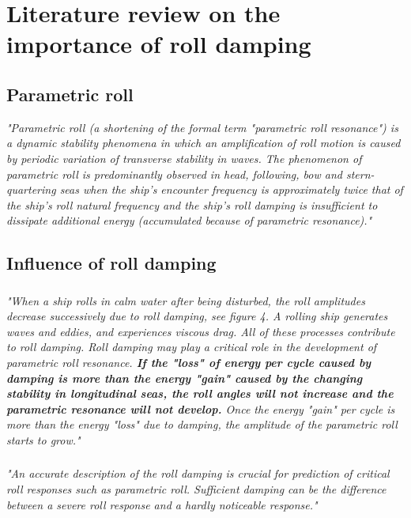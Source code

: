 \section{Literature review on the importance of roll damping}

\subsection{Parametric roll}

\emph{"Parametric roll (a shortening of the formal term "parametric roll resonance") is a dynamic stability phenomena in which an amplification of roll motion is caused by periodic variation of transverse stability in waves. The phenomenon of parametric roll is predominantly observed in head, following, bow and stern-quartering seas when the ship's encounter frequency is approximately twice that of the ship's roll natural frequency and the ship's roll damping is insufficient to dissipate additional energy (accumulated because of parametric resonance)."} \cite{imo_second_nodate}

\subsection{Influence of roll damping}
\subsubsection{}
\emph{"When a ship rolls in calm water after being disturbed, the roll amplitudes decrease successively due to roll damping, see figure 4. A rolling ship generates waves and eddies, and experiences viscous drag. All of these processes contribute to roll damping. Roll damping may play a critical role in the development of parametric roll resonance. \textbf{If the "loss" of energy per cycle caused by damping is more than the energy "gain" caused by the changing stability in longitudinal seas, the roll angles will not increase and the parametric resonance will not develop.} Once the energy "gain" per cycle is more than the energy "loss" due to damping, the amplitude of the parametric roll starts to grow."} \cite{imo_second_nodate}

\subsubsection{}
\emph{"An accurate description of the roll damping is crucial for prediction of critical roll responses such as parametric roll. Sufficient damping can be the difference between a severe roll response and a hardly noticeable response."} \cite{soder_ikeda_2019}
